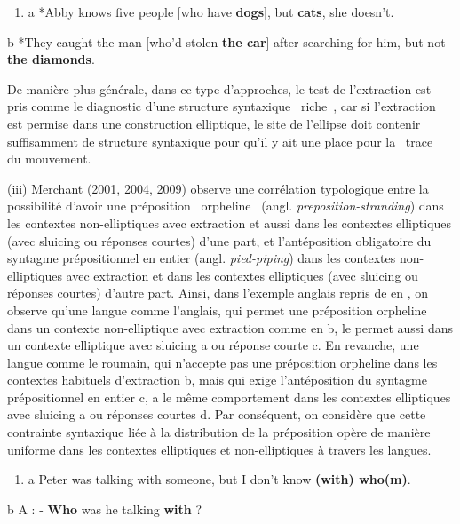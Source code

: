 \begin{enumerate}
\item \label{bkm:Ref305742766}a  *Abby knows five people [who have \textbf{dogs}], but \textbf{cats}, she doesn't. 


\end{enumerate}
  b  *They caught the man [who'd stolen \textbf{the car}] after searching for him, but not \textbf{the diamonds}.  

De manière plus générale, dans ce type d'approches, le test de l'extraction est pris comme le diagnostic d'une structure syntaxique {\guillemotleft}~riche~{\guillemotright}, car si l'extraction est permise dans une construction elliptique, le site de l'ellipse doit contenir suffisamment de structure syntaxique pour qu'il y ait une place pour la {\guillemotleft}~trace~{\guillemotright} du mouvement.~ 

(iii) Merchant (2001, 2004, 2009) observe une corrélation typologique entre la possibilité d'avoir une préposition {\guillemotleft}~orpheline~{\guillemotright} (angl. \textit{preposition-stranding}) dans les contextes non-elliptiques avec extraction et aussi dans les contextes elliptiques (avec sluicing ou réponses courtes) d'une part, et l'antéposition obligatoire du syntagme prépositionnel en entier (angl. \textit{pied-piping}) dans les contextes non-elliptiques avec extraction et dans les contextes elliptiques (avec sluicing ou réponses courtes) d'autre part. Ainsi, dans l'exemple anglais repris de \citet{Merchant2009} en , on observe qu'une langue comme l'anglais, qui permet une préposition orpheline dans un contexte non-elliptique avec extraction comme en b, le permet aussi dans un contexte elliptique avec sluicing a ou réponse courte c. En revanche, une langue comme le roumain, qui n'accepte pas une préposition orpheline dans les contextes habituels d'extraction b, mais qui exige l'antéposition du syntagme prépositionnel en entier c, a le même comportement dans les contextes elliptiques avec sluicing a ou réponses courtes d. Par conséquent, on considère que cette contrainte syntaxique liée à la distribution de la préposition opère de manière uniforme dans les contextes elliptiques et non-elliptiques à travers les langues.


\begin{enumerate}
\item \label{bkm:Ref305743542}a  Peter was talking with someone, but I don't know \textbf{(with) who(m)}. 


\end{enumerate}
  b  A : - \textbf{Who} was he talking \textbf{with} ?

